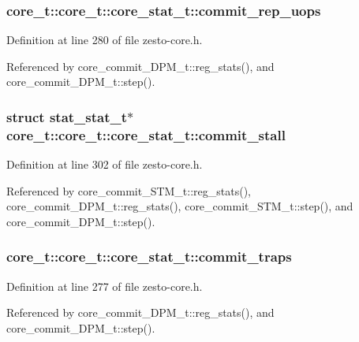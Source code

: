 \subsubsection[{commit\_\-rep\_\-uops}]{ core\_\-t::core\_\-t::core\_\-stat\_\-t::commit\_\-rep\_\-uops}\label{structcore__t_1_1core__stat__t_a4ceed200ed821113ab79de29aa771d3}




Definition at line 280 of file zesto-core.h.

Referenced by core\_\-commit\_\-DPM\_\-t::reg\_\-stats(), and core\_\-commit\_\-DPM\_\-t::step().
\subsubsection[{commit\_\-stall}]{\setlength{\rightskip}{0pt plus 5cm}struct {\bf stat\_\-stat\_\-t}$\ast$ core\_\-t::core\_\-t::core\_\-stat\_\-t::commit\_\-stall\hspace{0.3cm}{\tt  [read]}}\label{structcore__t_1_1core__stat__t_9aa1b782d670256448505543248b88dd}




Definition at line 302 of file zesto-core.h.

Referenced by core\_\-commit\_\-STM\_\-t::reg\_\-stats(), core\_\-commit\_\-DPM\_\-t::reg\_\-stats(), core\_\-commit\_\-STM\_\-t::step(), and core\_\-commit\_\-DPM\_\-t::step().
\subsubsection[{commit\_\-traps}]{ core\_\-t::core\_\-t::core\_\-stat\_\-t::commit\_\-traps}\label{structcore__t_1_1core__stat__t_e8807b9f2691c7f2f705541a69733514}




Definition at line 277 of file zesto-core.h.

Referenced by core\_\-commit\_\-DPM\_\-t::reg\_\-stats(), and core\_\-commit\_\-DPM\_\-t::step().
